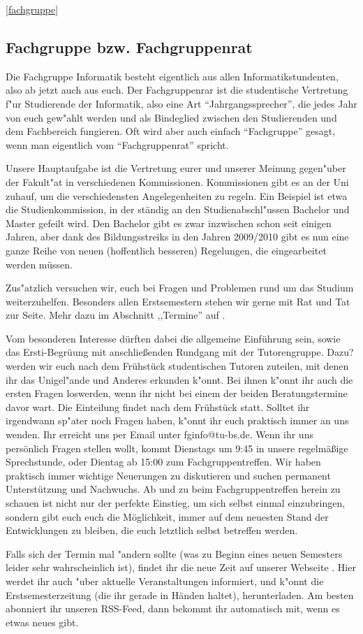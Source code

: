\ref{fachgruppe}\subsection{Fachgruppe bzw. Fachgruppenrat}

Die Fachgruppe Informatik besteht eigentlich aus allen 
Informatikstundenten, also ab jetzt auch aus euch. Der Fachgruppenrar 
ist die studentische Vertretung f"ur Studierende der Informatik, also 
eine Art "`Jahrgangssprecher"', die jedes Jahr von euch gew"ahlt werden 
und als Bindeglied zwischen den Studierenden und dem Fachbereich 
fungieren. Oft wird aber auch einfach "`Fachgruppe"' gesagt, wenn man 
eigentlich vom "`Fachgruppenrat"' spricht.

Unsere Hauptaufgabe ist die Vertretung eurer und unserer Meinung 
gegen"uber der Fakult"at in verschiedenen Kommissionen. Kommissionen 
gibt es an der Uni zuhauf, um die verschiedensten Angelegenheiten zu 
regeln. Ein Beispiel ist etwa die Studienkommission, in der ständig 
an den Studienabschl"ussen Bachelor und Master gefeilt wird. Den Bachelor 
gibt es zwar inzwischen schon seit einigen Jahren, aber dank des 
Bildungsstreiks in den Jahren 2009/2010 gibt es nun eine ganze Reihe 
von neuen (hoffentlich besseren) Regelungen, die eingearbeitet werden 
müssen.

Zus"atzlich versuchen wir, euch bei Fragen und Problemen rund um das 
Studium weiterzuhelfen. Besonders allen Erstsemestern stehen wir 
gerne mit Rat und Tat zur Seite.  Mehr dazu im Abschnitt ,,Termine'' auf
\pageref{termine}.

Vom besonderen Interesse dürften dabei die allgemeine Einführung sein,
sowie das Ersti-Begrüung mit anschließenden Rundgang mit der
Tutorengruppe.
Dazu? werden wir euch nach dem Frühstück studentischen 
Tutoren zuteilen, mit denen ihr das Unigel"ande und Anderes erkunden 
k"onnt. Bei ihnen k"onnt ihr auch die ersten Fragen loswerden, wenn 
ihr nicht bei einem der beiden Beratungstermine davor wart.
Die Einteilung findet nach dem Frühstück statt.
Solltet ihr irgendwann sp"ater noch Fragen haben, k"onnt ihr euch 
praktisch immer an uns wenden. Ihr erreicht uns per Email unter 
fginfo@tu-bs.de. Wenn ihr uns persönlich Fragen stellen wollt, kommt 
Dienstags um 9:45 in unsere regelmäßige Sprechstunde, oder Dientag ab 
15:00 zum Fachgruppentreffen. Wir haben praktisch immer wichtige 
Neuerungen zu diskutieren und suchen permanent Unterstützung und 
Nachwuchs. Ab und zu beim Fachgruppentreffen herein zu schauen ist 
nicht nur der perfekte Einstieg, um sich selbst einmal einzubringen, 
sondern gibt euch euch die Möglichkeit, immer auf dem neuesten Stand 
der Entwicklungen zu bleiben, die euch letztlich selbst betreffen werden.

Falls sich der Termin mal "andern sollte (was zu Beginn eines neuen 
Semesters leider sehr wahrscheinlich ist), findet ihr die neue Zeit 
auf unserer Webseite \mbox{}. Hier 
werdet ihr auch "uber aktuelle Veranstaltungen informiert, und k"onnt 
die Erstsemesterzeitung (die ihr gerade in Händen haltet), herunterladen. 
Am besten abonniert ihr unseren RSS-Feed, dann bekommt ihr automatisch 
mit, wenn es etwas neues gibt.
